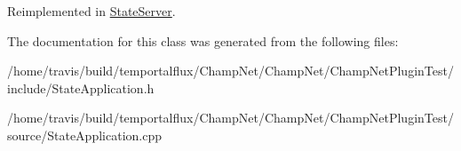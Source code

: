 Reimplemented in \hyperlink{class_state_server_aceb9a260a5c4a4d46607e8fe71be2667}{State\-Server}.



The documentation for this class was generated from the following files\-:\begin{DoxyCompactItemize}
\item 
/home/travis/build/temportalflux/\-Champ\-Net/\-Champ\-Net/\-Champ\-Net\-Plugin\-Test/include/State\-Application.\-h\item 
/home/travis/build/temportalflux/\-Champ\-Net/\-Champ\-Net/\-Champ\-Net\-Plugin\-Test/source/State\-Application.\-cpp\end{DoxyCompactItemize}
